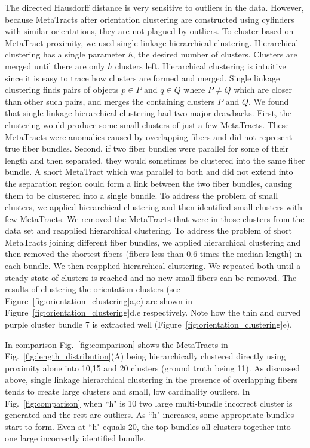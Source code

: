 The directed Hausdorff distance is very sensitive to outliers in the data.
However, because MetaTracts after orientation clustering are constructed using cylinders with similar orientations, they are not plagued by outliers.
To cluster based on MetaTract proximity, we used single linkage hierarchical clustering.
Hierarchical clustering has a single parameter $h$, the desired number of clusters.
Clusters are merged until there are only $h$ clusters left.
Hierarchical clustering is intuitive since it is easy to trace how clusters are formed and merged.
Single linkage clustering finds pairs of objects $p \in P$ and $q \in Q$ where $P \neq Q$ which are closer than other such pairs, and merges the containing clusters $P$ and $Q$.
We found that single linkage hierarchical clustering had two major drawbacks.
First, the clustering would produce some small clusters of just a few MetaTracts.
These MetaTracts were anomalies caused by overlapping fibers and did not represent true fiber bundles.
Second, if two fiber bundles were parallel for some of their length and then separated, they would sometimes be clustered into the same fiber bundle.
A short MetaTract which was parallel to both and did not extend into the separation region could form a link between the two fiber bundles, causing them to be clustered into a single bundle.
To address the problem of small clusters, we applied hierarchical clustering and then identified small clusters with few MetaTracts.
We removed the MetaTracts that were in those clusters from the data set and reapplied hierarchical clustering.
To address the problem of short MetaTracts joining different fiber bundles, we applied hierarchical clustering and then removed the
shortest fibers (fibers less than 0.6 times the median length) in each bundle. We then reapplied hierarchical clustering.
We repeated both until a steady state of clusters is reached and no new small fibers can be removed. The results of clustering the orientation clusters (see Figure~\ref{fig:orientation_clustering}a,c) are shown in Figure~\ref{fig:orientation_clustering}d,e respectively. Note how the thin and curved purple cluster bundle 7 is extracted well (Figure~\ref{fig:orientation_clustering}e). 



In comparison Fig.~\ref{fig:comparison} shows the MetaTracts in Fig.~\ref{fig:length_distribution}(A) being hierarchically clustered directly using proximity alone into 10,15 and 20 clusters (ground truth being 11). As discussed above, single linkage hierarchical clustering in the presence of overlapping fibers tends to create large clusters and small, low cardinality outliers. In Fig.~\ref{fig:comparison} when ``h" is 10 two large multi-bundle incorrect cluster is generated and the rest are outliers. As ``h" increases, some appropriate bundles start to form. Even at ``h" equals 20, the top bundles all clusters together into one large incorrectly identified bundle.

